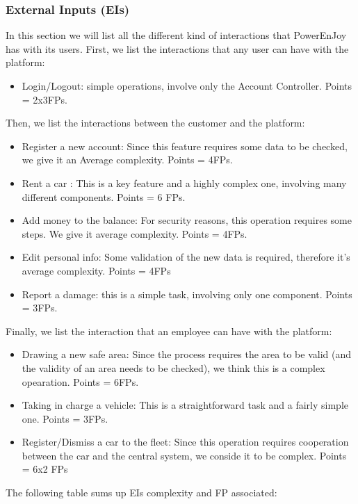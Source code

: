 \documentclass{article}
\begin{document}
\subsubsection{External Inputs (EIs)}
In this section we will list all the different kind of interactions that PowerEnJoy has with its users.
First, we list the interactions that any user can have with the platform: 
\begin{itemize}[noitemsep]
\item Login/Logout: simple operations, involve only the Account Controller. Points = 2x3FPs.
\end{itemize}
Then, we list the interactions between the customer and the platform:
\begin{itemize}[noitemsep]
\item Register a new account: Since this feature requires some data to be checked, we give it an Average complexity. Points = 4FPs.
\item Rent a car : This is a key feature and a highly complex one, involving many different components. Points = 6 FPs.
\item Add money to the balance: For security reasons, this operation requires some steps. We give it average complexity. Points = 4FPs.
\item Edit personal info: Some validation of the new data is required, therefore it's average complexity. Points = 4FPs
\item Report a damage: this is a simple task, involving only one component. Points = 3FPs.
\end{itemize}
Finally, we list the interaction that an employee can have with the platform:
\begin{itemize}[noitemsep]
\item Drawing a new safe area: Since the process requires the area to be valid (and the validity of an area needs to be checked), we think this is a complex opearation. Points = 6FPs.
\item Taking in charge a vehicle: This is a straightforward task and a fairly simple one. Points = 3FPs.
\item Register/Dismiss a car to the fleet: Since this operation requires cooperation between the car and the central system, we conside it to be complex. Points = 6x2 FPs
\end{itemize}
The following table sums up EIs complexity and FP associated:\\\\
\end{document}
